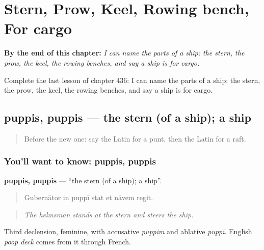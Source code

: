 
\chapter{Stern, Prow, Keel, Rowing bench, For cargo}
\label{ch:la-stern-prow-keel-rowing-bench-for-cargo}

\begin{chapteropening}
\textbf{By the end of this chapter:} \emph{I can name the parts of a ship: the stern, the prow, the keel, the rowing benches, and say a ship is for cargo.}

Complete the last lesson of chapter 436: I can name the parts of a ship: the stern, the prow, the keel, the rowing benches, and say a ship is for cargo.
\end{chapteropening}

\section[puppis, puppis]{puppis, puppis — the stern (of a ship); a ship}

\label{lesson:LA-C436-puppis}



\begin{quote}
Before the new one: say the Latin for a punt, then the Latin for a raft.
\end{quote}

\subsection*{You'll want to know: puppis, puppis}
\textbf{puppis, puppis} — \textquotedblleft{}the stern (of a ship); a ship\textquotedblright{}.

\begin{quote}
Gubernātor in puppī stat et nāvem regit.
\end{quote}

\begin{quote}
\emph{The helmsman stands at the stern and steers the ship.}
\end{quote}

Third declension, feminine, with accusative \emph{puppim} and ablative \emph{puppī}. English \emph{poop deck} comes from it through French.

